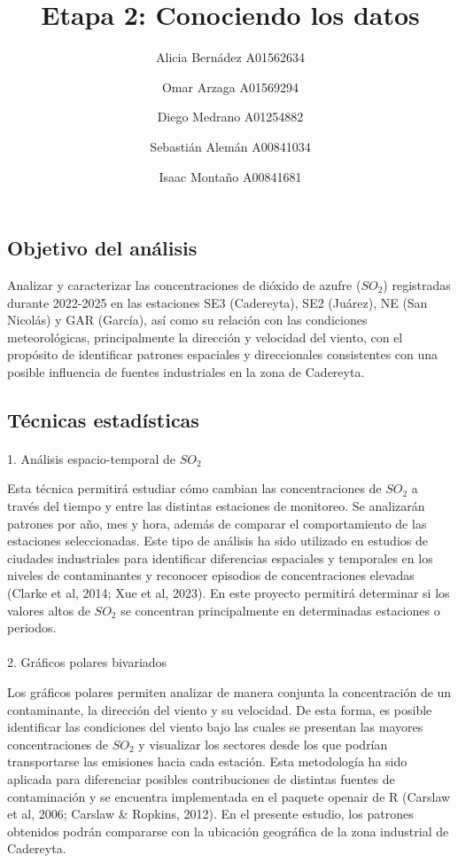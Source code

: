 \documentclass[
  letterpaper,
  DIV=11,
  numbers=noendperiod]{scrartcl}
\title{Etapa 2: Conociendo los datos}
\author{Alicia Bernádez A01562634 \and Omar Arzaga A01569294 \and Diego
Medrano A01254882 \and Sebastián Alemán A00841034 \and Isaac Montaño
A00841681}
\date{}
\makeatletter
\let\oldparagraph\paragraph
\renewcommand{\paragraph}{
    \@ifstar
      \xxxParagraphStar
      \xxxParagraphNoStar
  }
\newcommand{\xxxParagraphStar}[1]{\oldparagraph*{#1}\mbox{}}
\newcommand{\xxxParagraphNoStar}[1]{\oldparagraph{#1}\mbox{}}
\makeatother
\begin{document}
\maketitle


\subsection{Objetivo del análisis}\label{objetivo-del-anuxe1lisis}

Analizar y caracterizar las concentraciones de dióxido de azufre
(\(SO_2\)) registradas durante 2022-2025 en las estaciones SE3
(Cadereyta), SE2 (Juárez), NE (San Nicolás) y GAR (García), así como su
relación con las condiciones meteorológicas, principalmente la dirección
y velocidad del viento, con el propósito de identificar patrones
espaciales y direccionales consistentes con una posible influencia de
fuentes industriales en la zona de Cadereyta.

\subsection{Técnicas estadísticas}\label{tuxe9cnicas-estaduxedsticas}

\paragraph{\texorpdfstring{1. Análisis espacio-temporal de
\(SO_2\)}{1. Análisis espacio-temporal de SO\_2}}\label{anuxe1lisis-espacio-temporal-de-so_2}

Esta técnica permitirá estudiar cómo cambian las concentraciones de
\(SO_2\) a través del tiempo y entre las distintas estaciones de
monitoreo. Se analizarán patrones por año, mes y hora, además de
comparar el comportamiento de las estaciones seleccionadas. Este tipo de
análisis ha sido utilizado en estudios de ciudades industriales para
identificar diferencias espaciales y temporales en los niveles de
contaminantes y reconocer episodios de concentraciones elevadas (Clarke
et al, 2014; Xue et al, 2023). En este proyecto permitirá determinar si
los valores altos de \(SO_2\) se concentran principalmente en
determinadas estaciones o periodos.

\paragraph{2. Gráficos polares
bivariados}\label{gruxe1ficos-polares-bivariados}

Los gráficos polares permiten analizar de manera conjunta la
concentración de un contaminante, la dirección del viento y su
velocidad. De esta forma, es posible identificar las condiciones del
viento bajo las cuales se presentan las mayores concentraciones de
\(SO_2\) y visualizar los sectores desde los que podrían transportarse
las emisiones hacia cada estación. Esta metodología ha sido aplicada
para diferenciar posibles contribuciones de distintas fuentes de
contaminación y se encuentra implementada en el paquete openair de R
(Carslaw et al, 2006; Carslaw \& Ropkins, 2012). En el presente estudio,
los patrones obtenidos podrán compararse con la ubicación geográfica de
la zona industrial de Cadereyta.
\end{document}
